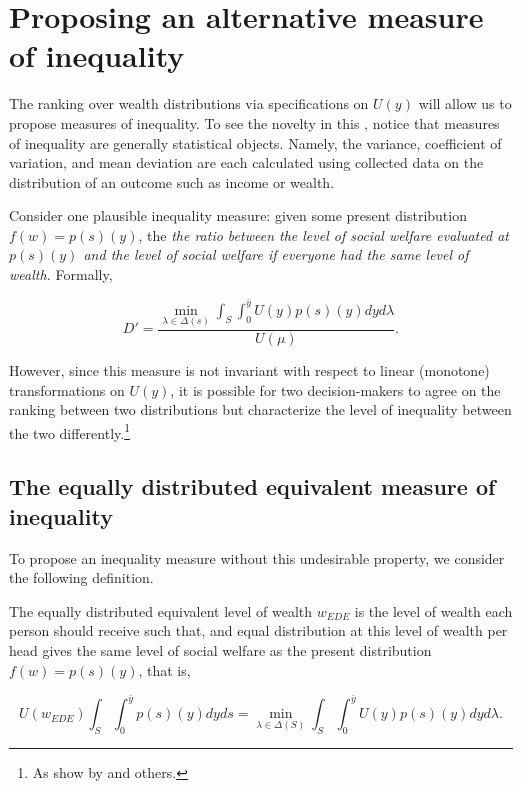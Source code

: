 \documentclass[\econtexRoot/IneqMeas]{subfiles}
\begin{document}
\onlyinsubfile{\setcounter{section}{5}}
\section{Proposing an alternative measure of inequality}
\notinsubfile{\label{sec:Altmeasure}}


\par The ranking over wealth distributions via specifications on $U(y)$ will allow us to propose measures of inequality. To see the novelty in this , notice that measures of inequality are generally statistical objects. Namely, the variance, coefficient of variation, and mean deviation are each calculated using collected data on the distribution of an outcome such as income or wealth.

\par Consider one plausible inequality measure: given some present distribution $f(w) = p(s)(y)$, the \textit{the ratio between the level of social welfare evaluated at $p(s)(y)$ and the level of social welfare if everyone had the same level of wealth.} Formally,

$$ D' = \frac{\min_{\lambda \in \Delta(s)} \int_{S} \int_{0}^{\bar{y}} U(y) p(s)(y) dyd\lambda }{U(\mu)}.$$ 

\par However, since this measure is not invariant with respect to linear (monotone) transformations on $U(y)$, it is possible for two decision-makers to agree on the ranking between two distributions but characterize the level of inequality between the two differently.\footnote{As show by \cite{hd20}  and others.}

\subsection{The equally distributed equivalent measure of inequality}

\par To propose an inequality measure without this undesirable property, we consider the following definition.

\begin{dfn}
The equally distributed equivalent level of wealth $w_{EDE}$ is the level of wealth each person should receive such that, and equal distribution at this level of wealth per head gives the same level of social welfare as the present distribution $f(w) = p(s)(y)$, that is,

$$ U(w_{EDE}) \int_S \int_{0}^{\bar{y}} p(s)(y) dyds = \min_{\lambda \in \Delta(S)} \int_{S} \int_{0}^{\bar{y}} U(y)p(s)(y)dyd\lambda.$$
\end{dfn}
\end{document}

